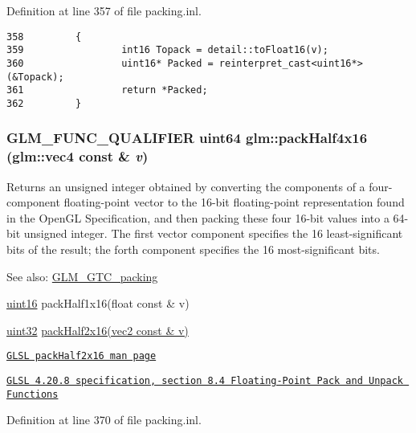 Definition at line 357 of file packing.inl.

\begin{Code}\begin{verbatim}358         {
359                 int16 Topack = detail::toFloat16(v);
360                 uint16* Packed = reinterpret_cast<uint16*>(&Topack);
361                 return *Packed;
362         }
\end{verbatim}
\end{Code}


\hypertarget{group__gtc__packing_g8104f0b719b7792491f2b789a6dd6f96}{
\subsubsection[packHalf4x16]{\setlength{\rightskip}{0pt plus 5cm}GLM\_\-FUNC\_\-QUALIFIER uint64 glm::packHalf4x16 ({\bf glm::vec4} const \& {\em v})}}
\label{group__gtc__packing_g8104f0b719b7792491f2b789a6dd6f96}


Returns an unsigned integer obtained by converting the components of a four-component floating-point vector to the 16-bit floating-point representation found in the OpenGL Specification, and then packing these four 16-bit values into a 64-bit unsigned integer. The first vector component specifies the 16 least-significant bits of the result; the forth component specifies the 16 most-significant bits.

\begin{Desc}
\item[See also:]\hyperlink{group__gtc__packing}{GLM\_\-GTC\_\-packing} 

\hyperlink{group__gtc__type__precision_gd8c2939e1fdd8e5828b31d95c52255d5}{uint16} packHalf1x16(float const \& v) 

\hyperlink{group__gtc__type__precision_g202b6a53c105fcb7e531f9b443518451}{uint32} \hyperlink{group__core__func__packing_g082f6dd65f73a547ed3067ef00be036f}{packHalf2x16(vec2 const \& v)} 

\href{http://www.opengl.org/sdk/docs/manglsl/xhtml/packHalf2x16.xml}{\tt GLSL packHalf2x16 man page} 

\href{http://www.opengl.org/registry/doc/GLSLangSpec.4.20.8.pdf}{\tt GLSL 4.20.8 specification, section 8.4 Floating-Point Pack and Unpack Functions} \end{Desc}


Definition at line 370 of file packing.inl.

